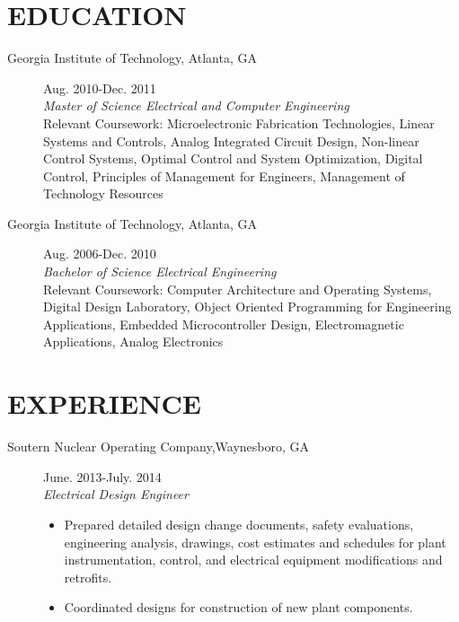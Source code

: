 \documentclass{res}
\begin{document}
\begin{resume}
\section{EDUCATION}
	\begin{description}
		\item[{Georgia Institute of Technology}, Atlanta, GA]\hfill Aug. 2010-Dec. 2011\\\textit{Master of Science Electrical and Computer Engineering}\\Relevant Coursework: Microelectronic Fabrication Technologies, Linear Systems and Controls, Analog Integrated Circuit Design, Non-linear Control Systems, Optimal Control and System Optimization, Digital Control, Principles of Management for Engineers, Management of Technology Resources
		\item[{Georgia Institute of Technology}, Atlanta, GA]\hfill Aug. 2006-Dec. 2010\\\textit{Bachelor of Science Electrical Engineering}\\Relevant Coursework: Computer Architecture and Operating Systems, Digital Design Laboratory, Object Oriented Programming for Engineering Applications, Embedded Microcontroller Design, Electromagnetic Applications, Analog Electronics
		
	\end{description}
\section{EXPERIENCE}
   	\begin{description}
   		\item[{Soutern Nuclear Operating Company},Waynesboro, GA]\hfill June. 2013-July. 2014\\\textit{Electrical Design Engineer}
   		\vspace{-0.1in} 
   		\begin{itemize}
   		   	\item Prepared detailed design change documents, safety evaluations, engineering analysis, drawings, cost estimates and schedules for plant instrumentation, control, and electrical equipment modifications and retrofits.
   		   	\item Coordinated designs for construction of new plant components. 
   		\end{itemize}
   		

\end{description}
\end{resume}
\end{document}
